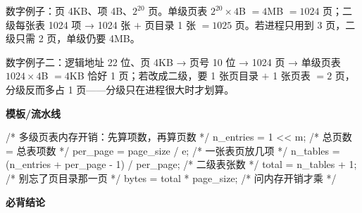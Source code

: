 \documentclass[10pt,a4paper]{ctexart}
\begin{document}
数字例子：页 4KB、项 4B、$2^{20}$ 页。单级页表 $2^{20}\times 4$B $=4$MB $=1024$ 页；二级每张表 1024 项 → 1024 张 $+$ 页目录 1 张 $=1025$ 页。若进程只用到 3 页，二级只需 2 页，单级仍要 4MB。

数字例子二：逻辑地址 22 位、页 4KB → 页号 10 位 → 1024 页 → 单级页表 $1024\times 4$B $=4$KB 恰好 1 页；若改成二级，要 1 张页目录 $+$ 1 张页表 $=2$ 页，分级反而多占 1 页——分级只在进程很大时才划算。

\textbf{模板/流水线}

\begin{codebox}
/* 多级页表内存开销：先算项数，再算页数 */
n_entries = 1 << m;                    /* 总页数 = 总表项数 */
per_page  = page_size / e;             /* 一张表页放几项 */
n_tables  = (n_entries + per_page - 1) / per_page;   /* 二级表张数 */
total     = n_tables + 1;              /* 别忘了页目录那一页 */
bytes     = total * page_size;         /* 问内存开销才乘 */
\end{codebox}




\textbf{必背结论}
\end{document}

